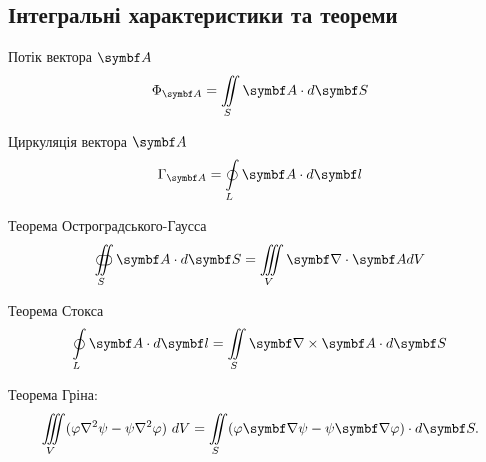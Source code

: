 \subsection{Інтегральні характеристики та теореми}


Потік вектора $\vect{A}$
\begin{equation}\label{flux}
	\Phi_{\vect{A}} = \iint\limits_S \vect{A}\cdot d\vect{S}
\end{equation}

Циркуляція вектора $\vect{A}$
\begin{equation}\label{circulation}
	\Gamma_{\vect{A}} = \oint\limits_L \vect{A}\cdot d\vect{l}
\end{equation}

Теорема Остроградського-Гаусса
\begin{equation}\label{OGTheorem}
	\oiint\limits_S \vect{A}\cdot d\vect{S} = \iiint\limits_V \divg\vect{A} dV
\end{equation}

Теорема Стокса
\begin{equation}\label{Stoksheorem}
	\oint\limits_L \vect{A}\cdot d\vect{l} = \iint\limits_S \rot\vect{A} \cdot d\vect{S}
\end{equation}

Теорема Гріна:
\begin{equation}\label{Grin}
	\iiint\limits_{V}(\varphi \nabla ^{2}\psi -\psi \nabla ^{2}\varphi )\ dV=\iint \limits _{S}(\varphi \vect{\nabla} \psi -\psi \vect{\nabla} \varphi )\cdot d\vect{S}.
\end{equation}
%
%
%

